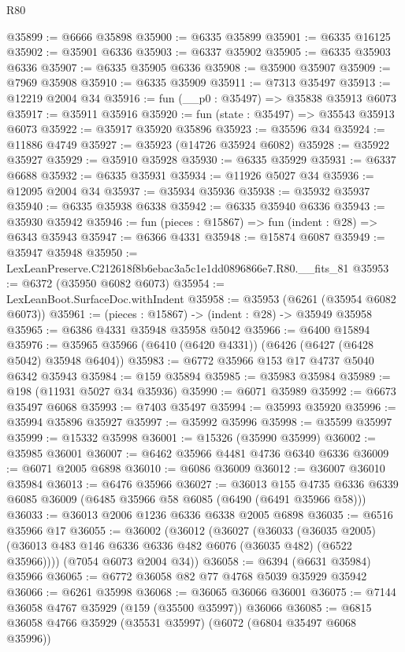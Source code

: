 \begin{lexlean}{R80}
\begin{coremodule}
@35899 := @6666 @35898
@35900 := @6335 @35899
@35901 := @6335 @16125
@35902 := @35901 @6336
@35903 := @6337 @35902
@35905 := @6335 @35903 @6336
@35907 := @6335 @35905 @6336
@35908 := @35900 @35907
@35909 := @7969 @35908
@35910 := @6335 @35909
@35911 := @7313 @35497
@35913 := @12219 @2004 @34
@35916 := fun (__p0 : @35497) => @35838 @35913 @6073
@35917 := @35911 @35916
@35920 := fun (state : @35497) => @35543 @35913 @6073
@35922 := @35917 @35920 @35896
@35923 := @35596 @34
@35924 := @11886 @4749
@35927 := @35923 (@14726 @35924 @6082)
@35928 := @35922 @35927
@35929 := @35910 @35928
@35930 := @6335 @35929
@35931 := @6337 @6688
@35932 := @6335 @35931
@35934 := @11926 @5027 @34
@35936 := @12095 @2004 @34
@35937 := @35934 @35936
@35938 := @35932 @35937
@35940 := @6335 @35938 @6338
@35942 := @6335 @35940 @6336
@35943 := @35930 @35942
@35946 := fun (pieces : @15867) => fun (indent : @28) => @6343 @35943
@35947 := @6366 @4331
@35948 := @15874 @6087
@35949 := @35947 @35948
@35950 := LexLeanPreserve.C212618f8b6ebac3a5c1e1dd0896866e7.R80.__fits_81
@35953 := @6372 (@35950 @6082 @6073)
@35954 := LexLeanBoot.SurfaceDoc.withIndent
@35958 := @35953 (@6261 (@35954 @6082 @6073))
@35961 := (pieces : @15867) -> (indent : @28) -> @35949 @35958
@35965 := @6386 @4331 @35948 @35958 @5042
@35966 := @6400 @15894
@35976 := @35965 @35966 (@6410 (@6420 @4331)) (@6426 (@6427 (@6428 @5042) @35948 @6404))
@35983 := @6772 @35966 @153 @17 @4737 @5040 @6342 @35943
@35984 := @159 @35894
@35985 := @35983 @35984
@35989 := @198 (@11931 @5027 @34 @35936)
@35990 := @6071 @35989
@35992 := @6673 @35497 @6068
@35993 := @7403 @35497
@35994 := @35993 @35920
@35996 := @35994 @35896 @35927
@35997 := @35992 @35996
@35998 := @35599 @35997
@35999 := @15332 @35998
@36001 := @15326 (@35990 @35999)
@36002 := @35985 @36001
@36007 := @6462 @35966 @4481 @4736 @6340 @6336
@36009 := @6071 @2005 @6898
@36010 := @6086 @36009
@36012 := @36007 @36010 @35984
@36013 := @6476 @35966
@36027 := @36013
    @155
    @4735
    @6336
    @6339
    @6085
    @36009
    (@6485 @35966 @58 @6085 (@6490 (@6491 @35966 @58)))
@36033 := @36013 @2006 @1236 @6336 @6338 @2005 @6898
@36035 := @6516 @35966 @17
@36055 := @36002
    (@36012
      (@36027
        (@36033
          (@36035 @2005)
          (@36013 @483 @146 @6336 @6336 @482 @6076 (@36035 @482) (@6522 @35966))))
      (@7054 @6073 @2004 @34))
@36058 := @6394 (@6631 @35984) @35966
@36065 := @6772 @36058 @82 @77 @4768 @5039 @35929 @35942
@36066 := @6261 @35998
@36068 := @36065 @36066 @36001
@36075 := @7144 @36058 @4767 @35929 (@159 (@35500 @35997)) @36066
@36085 := @6815 @36058 @4766 @35929 (@35531 @35997) (@6072 (@6804 @35497 @6068 @35996))

\end{coremodule}
\end{lexlean}
